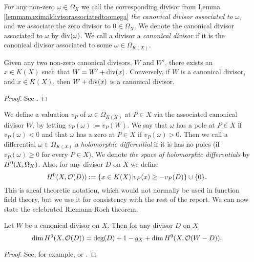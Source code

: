 For any non-zero $\omega \in \Omega_X$ we call the corresponding divisor from Lemma \ref{lemmamaximaldivisorassociatedtoomega} {\em the canonical divisor associated to $\omega$}, and we associate the zero divisor to $0 \in \Omega_X$.
We denote the canonical divisor associated to $\omega$ by $\operatorname{div}(\omega)$.
We call a divisor a {\em canonical divisor} if it is the canonical divisor associated to some $\omega \in \Omega_{K(X)}$.
    
    \begin{lem}
    Given any two non-zero canonical divisors, $W$ and $W'$, there exists an $x\in K(X)$ such that $W = W' + \operatorname{div}(x)$.
    Conversely, if $W$ is a canonical divisor, and $x\in K(X)$, then $W + \operatorname{div}(x)$ is a canonical divisor.
    \end{lem}
    \begin{proof}
    See \cite[Prop. 1.5.13]{stichtenoth}.
    \end{proof}

We define a valuation $v_P$ of $\omega \in \Omega_{K(X)}$ at $P \in X$ via the associated canonical divisor $W$, by letting $v_P(\omega) := v_P(W)$.
We say that $\omega$ has a pole at $P \in X$ if $v_P(\omega) < 0$ and that $\omega$ has a zero at $P \in X$ if $v_P(\omega) >0$.
Then we call a differential $\omega \in \Omega_{K(X)}$ a {\em holomorphic differential} if it is has no poles (\ie if $v_P(\omega) \geq 0 $ for every $P \in X$).
We denote {\em the space of holomorphic differentials} by ${H^0(X,\Omega_X)}$.
Also, for any divisor $D$ on $X$ we define 
    \[
    H^0(X,{\cal O}(D)) := \{x\in K(X) | v_P(x) \geq -v_P(D)\}\cup \{0\}.
    \]
This is sheaf theoretic notation, which would not normally be used in function field theory, but we use it for consistency with the rest of the report.
We can now state the celebrated Riemann-Roch theorem.

    \begin{thm}\label{theoremriemannroch}
    Let $W$ be a canonical divisor on $X$.
    Then for any divisor $D$ on $X$ 
        \[
        \dim H^0(X,{\cal O}(D)) = \deg(D) + 1 - g_X + \dim H^0(X,{\cal O}(W-D)).
        \]
    \end{thm}
    \begin{proof}
    See, for example, \cite[8.6]{fulton} or \cite[Thm. 1.5.15]{stichtenoth}.
    \end{proof}


